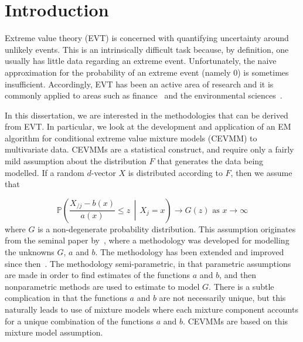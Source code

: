 \documentclass[11pt,twoside,openany]{book}
\newcommand{\prob}{\mathbb{P}}
\numberwithin{Theorem}{chapter}
\numberwithin{Definition}{chapter}
\numberwithin{Lemma}{chapter}
\numberwithin{Algorithm}{chapter}
\numberwithin{equation}{chapter}
\begin{document}
\clearpage

\thispagestyle{plain}
\listoftables
\clearpage

\thispagestyle{plain}
\listoffigures
\clearpage

\thispagestyle{plain}
\listofalgorithms
\clearpage

\setcounter{page}{1}






\cleardoublepage %

\chapter{Introduction}\label{sec.intro}

Extreme value theory (EVT) is concerned with quantifying uncertainty around
unlikely events. This is an intrinsically difficult task because,
by definition, one usually has little data regarding an extreme event.
Unfortunately, the naive approximation for the probability of an extreme
event (namely 0) is sometimes insufficient. Accordingly, EVT has been an active area
of research and it is commonly applied to areas such as
finance~\citep{embrechts1999extreme,gilli2006application,gkillas2018application} and
the environmental sciences~\citep{katz1999extreme,towler2010modeling}.

In this dissertation, we are interested in the methodologies that
can be derived from EVT. In particular, we look at the development and application of an EM
algorithm for conditional extreme value mixture models (CEVMM) to multivariate
data. CEVMMs are a statistical construct, and
require only a fairly mild assumption about the distribution $F$ that generates
the data being modelled. If a random $d$-vector $X$ is
distributed according to $F$, then we assume that

\[
  \prob\left(\frac{X_{/j} - b(x)}{a(x)} \leq z\,\middle|\,X_j = x\right)\rightarrow G(z) \text{ as } x\rightarrow\infty
\]
where $G$ is a non-degenerate probability distribution. This assumption
originates from the seminal paper by~\cite{heffernan2004conditional}, where a
methodology was developed for modelling the unknowns $G$, $a$ and $b$. The
methodology has been extended and improved since
then~\citep{keef2013estimation}. The methodology
semi-parametric, in that parametric assumptions are made in order to find
estimates of the functions $a$ and $b$, and then nonparametric methods are used
to estimate to model $G$. There is a subtle complication in that the functions
$a$ and $b$ are not necessarily unique, but this naturally leads to use
of mixture models where each mixture component accounts for a unique combination
of the functions $a$ and $b$. CEVMMs are based on this mixture model assumption.
\end{document}
